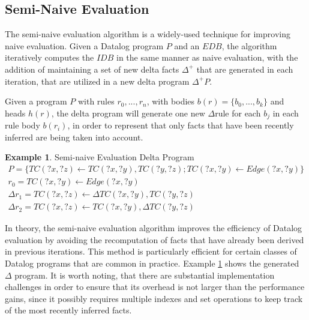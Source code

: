 \documentclass[sigconf,screen,review,natbib]{acmart}
\theoremstyle{definition}
\newtheorem{exmp}{Example}[section]
\begin{document}
\subsection{Semi-Naive Evaluation}

The semi-naive evaluation algorithm \cite{datalog} is a widely-used technique for improving naive evaluation.
Given a Datalog program $P$ and an $EDB$, the algorithm iteratively computes the $IDB$ in the same manner as
naive evaluation, with the addition of maintaining a set of new delta facts $\Delta^+$ that are generated in
each iteration, that are utilized in a new delta program $\Delta^+P$.

Given a program $P$ with rules $r_0, ..., r_n$, with bodies $b(r) = \{b_0, ..., b_k\}$ and heads $h(r)$, the
delta program will generate one new $\Delta$rule for each $b_j$ in each rule body $b(r_i)$, in order to
represent that only facts that have been recently inferred are being taken into account.

\begin{exmp}{Semi-naive Evaluation Delta Program}
	\tiny
	\begin{align}
		P = \{ TC(?x, ?z) \leftarrow TC(?x, ?y), TC(?y, ?z); TC(?x, ?y) \leftarrow Edge(?x, ?y) \} \nonumber                                                           \\
		r_0 = TC(?x, ?y) \leftarrow Edge(?x, ?y)                                                                                                                       \\
		\Delta r_1 = TC(?x, ?z) \leftarrow \Delta TC(?x, ?y), TC(?y, ?z)                                                                                     \nonumber \\
		\Delta r_2 = TC(?x, ?z) \leftarrow TC(?x, ?y), \Delta TC(?y, ?z)
	\end{align}
	\label{exsne}
\end{exmp}

In theory, the semi-naive evaluation algorithm improves the efficiency of Datalog evaluation by avoiding
the recomputation of facts that have already been derived in previous iterations. This method is particularly
efficient for certain classes of Datalog programs that are common in practice. Example \ref{exsne} shows
the generated $\Delta$ program. It is worth noting, that there are substantial implementation challenges in order
to ensure that its overhead is not larger than the performance gains, since it possibly requires multiple
indexes and set operations to keep track of the most recently inferred facts.
\end{document}

